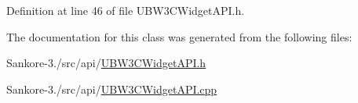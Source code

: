 Definition at line 46 of file U\-B\-W3\-C\-Widget\-A\-P\-I.\-h.



The documentation for this class was generated from the following files\-:\begin{DoxyCompactItemize}
\item 
Sankore-\/3./src/api/\hyperlink{_u_b_w3_c_widget_a_p_i_8h}{U\-B\-W3\-C\-Widget\-A\-P\-I.\-h}\item 
Sankore-\/3./src/api/\hyperlink{_u_b_w3_c_widget_a_p_i_8cpp}{U\-B\-W3\-C\-Widget\-A\-P\-I.\-cpp}\end{DoxyCompactItemize}
